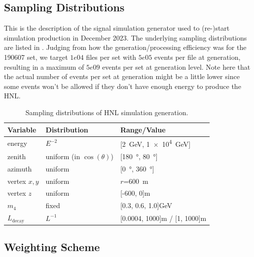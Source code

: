 \subsection{Sampling Distributions}

This is the description of the signal simulation generator used to (re-)start simulation production in December 2023. The underlying sampling distributions are listed in . Judging from how the generation/processing efficiency was for the 190607 set, we target $1e04$ files per set with $5e05$ events per file at generation, resulting in a maximum of $5e09$ events per set at generation level. Note here that the actual number of events per set at generation might be a little lower since some events won't be allowed if they don't have enough energy to produce the HNL.

\begin{table}
    \centering
    \begin{tabular} { lll }
        \hline \hline 
        \textbf{Variable} & \textbf{Distribution} & \textbf{Range/Value} \\
        \hline \hline 
        energy & $E^{-2}$ & [\SI{2}{\GeV}, \SI{1e4}{\GeV}] \\
        zenith & uniform (in $\cos(\theta)$) & [\SI{180}{\degree}, \SI{80}{\degree}] \\
        azimuth & uniform & [\SI{0}{\degree}, \SI{360}{\degree}] \\
        vertex $x,y$ & uniform & $r$=\SI{600}{\metre} \\
        vertex $z$ & uniform & [-600, 0]\si{\metre} \\
        $m_\mathrm{4}$ & fixed & [0.3, 0.6, 1.0]\si{\GeV} \\
        $L_\mathrm{decay}$ & $L^{-1}$ & [0.0004, 1000]\si{\metre} / [1, 1000]\si{\metre} \\
        \hline
    \end{tabular}
    \caption[xx]{Sampling distributions of HNL simulation generation.}   
\end{table}


\subsection{Weighting Scheme}

